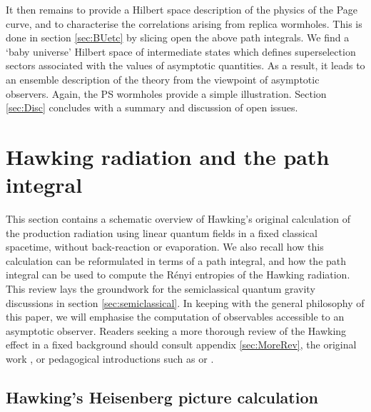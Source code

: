 \documentclass[letterpaper,12pt]{article}
\begin{document}
It then remains to provide a Hilbert space description of the physics of the Page curve, and to characterise the correlations arising from replica wormholes.  This is done in section \ref{sec:BUetc} by slicing open the above path integrals.  We find a `baby universe' Hilbert space of intermediate states which defines superselection sectors associated with the values of asymptotic quantities.  As a result, it leads to an ensemble description of the theory from the viewpoint of asymptotic observers.  Again, the PS wormholes provide a simple illustration.  Section \ref{sec:Disc} concludes with a summary and discussion of open issues.





\section{Hawking radiation and the path integral}\label{sec:HawkingReview}

This section contains a schematic overview of Hawking's original calculation \cite{Hawking:1974sw} of the production radiation using linear quantum fields in a fixed classical spacetime, without back-reaction or evaporation. We also recall how this calculation can be reformulated in terms of a path integral, and how the path integral can be used to compute the R\'enyi entropies of the Hawking radiation. This review lays the groundwork for the semiclassical quantum gravity discussions in section \ref{sec:semiclassical}. In keeping with the general philosophy of this paper, we will emphasise the computation of observables accessible to an asymptotic observer. Readers seeking a more thorough review of the Hawking effect in a fixed background should consult appendix \ref{sec:MoreRev}, the original work \cite{Hawking:1974sw}, or pedagogical introductions such as \cite{Jacobson:2003vx} or \cite{Harlow:2014yka}.


\subsection{Hawking's Heisenberg picture calculation}
 \label{sec:Heisenberg}
\end{document}
